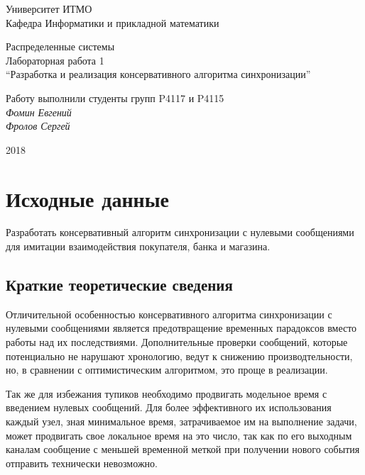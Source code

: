 \documentclass[12pt, a4paper]{article}
\begin{document}
\thispagestyle{empty}
\begin{center}
  {\large
    Университет ИТМО \\
    Кафедра Информатики и прикладной математики \\
  }
\end{center}
\begin{center}
  {\large
    Распределенные системы\\
  }
  {\large
    Лабораторная работа 1\\
    ``Разработка и реализация консервативного алгоритма синхронизации''\\
  }

\end{center}
\begin{flushright}
  Работу выполнили студенты групп P4117 и P4115\\
  {\it Фомин Евгений\\
    Фролов Сергей \\
  }
\end{flushright}
\begin{center}
  2018
\end{center}
\newpage

\section{Исходные данные}
Разработать консервативный алгоритм синхронизации с нулевыми сообщениями
для имитации взаимодействия покупателя, банка и магазина.

\subsection{Краткие теоретические сведения}
Отличительной особенностью консервативного алгоритма синхронизации
с нулевыми сообщениями является
предотвращение временных парадоксов вместо работы над их
последствиями. Дополнительные проверки сообщений, которые
потенциально не нарушают хронологию, ведут к снижению
производтельности, но, в сравнении с оптимистическим алгоритмом,
это проще в реализации.

Так же для избежания тупиков необходимо продвигать модельное
время с введением нулевых сообщений. Для более эффективного их
использования каждый узел, зная минимальное время, затрачиваемое
им на выполнение задачи, может продвигать свое локальное время на это число,
так как по его выходным каналам сообщение с меньшей временной
меткой при получении нового события отправить технически невозможно.
\end{document}
